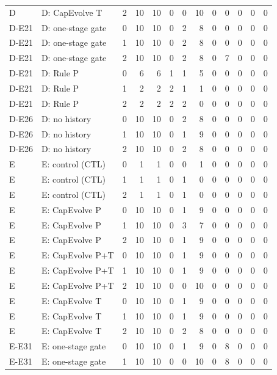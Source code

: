 \begin{table}[t]
{\begin{tabular}{@{}llrrrrrrrrrrr@{}}
D & D: CapEvolve T & 2 & 10 & 10 & 0 & 0 & 10 & 0 & 0 & 0 & 0 & 0 \\
D-E21 & D: one-stage gate & 0 & 10 & 10 & 0 & 2 & 8 & 0 & 0 & 0 & 0 & 0 \\
D-E21 & D: one-stage gate & 1 & 10 & 10 & 0 & 2 & 8 & 0 & 0 & 0 & 0 & 0 \\
D-E21 & D: one-stage gate & 2 & 10 & 10 & 0 & 2 & 8 & 0 & 7 & 0 & 0 & 0 \\
D-E21 & D: Rule P & 0 & 6 & 6 & 1 & 1 & 5 & 0 & 0 & 0 & 0 & 0 \\
D-E21 & D: Rule P & 1 & 2 & 2 & 2 & 1 & 1 & 0 & 0 & 0 & 0 & 0 \\
D-E21 & D: Rule P & 2 & 2 & 2 & 2 & 2 & 0 & 0 & 0 & 0 & 0 & 0 \\
D-E26 & D: no history & 0 & 10 & 10 & 0 & 2 & 8 & 0 & 0 & 0 & 0 & 0 \\
D-E26 & D: no history & 1 & 10 & 10 & 0 & 1 & 9 & 0 & 0 & 0 & 0 & 0 \\
D-E26 & D: no history & 2 & 10 & 10 & 0 & 2 & 8 & 0 & 0 & 0 & 0 & 0 \\
E & E: control (CTL) & 0 & 1 & 1 & 0 & 0 & 1 & 0 & 0 & 0 & 0 & 0 \\
E & E: control (CTL) & 1 & 1 & 1 & 0 & 1 & 0 & 0 & 0 & 0 & 0 & 0 \\
E & E: control (CTL) & 2 & 1 & 1 & 0 & 1 & 0 & 0 & 0 & 0 & 0 & 0 \\
E & E: CapEvolve P & 0 & 10 & 10 & 0 & 1 & 9 & 0 & 0 & 0 & 0 & 0 \\
E & E: CapEvolve P & 1 & 10 & 10 & 0 & 3 & 7 & 0 & 0 & 0 & 0 & 0 \\
E & E: CapEvolve P & 2 & 10 & 10 & 0 & 1 & 9 & 0 & 0 & 0 & 0 & 0 \\
E & E: CapEvolve P+T & 0 & 10 & 10 & 0 & 1 & 9 & 0 & 0 & 0 & 0 & 0 \\
E & E: CapEvolve P+T & 1 & 10 & 10 & 0 & 1 & 9 & 0 & 0 & 0 & 0 & 0 \\
E & E: CapEvolve P+T & 2 & 10 & 10 & 0 & 0 & 10 & 0 & 0 & 0 & 0 & 0 \\
E & E: CapEvolve T & 0 & 10 & 10 & 0 & 1 & 9 & 0 & 0 & 0 & 0 & 0 \\
E & E: CapEvolve T & 1 & 10 & 10 & 0 & 1 & 9 & 0 & 0 & 0 & 0 & 0 \\
E & E: CapEvolve T & 2 & 10 & 10 & 0 & 2 & 8 & 0 & 0 & 0 & 0 & 0 \\
E-E31 & E: one-stage gate & 0 & 10 & 10 & 0 & 1 & 9 & 0 & 8 & 0 & 0 & 0 \\
E-E31 & E: one-stage gate & 1 & 10 & 10 & 0 & 0 & 10 & 0 & 8 & 0 & 0 & 0 \\

\end{tabular}}
\end{table}

